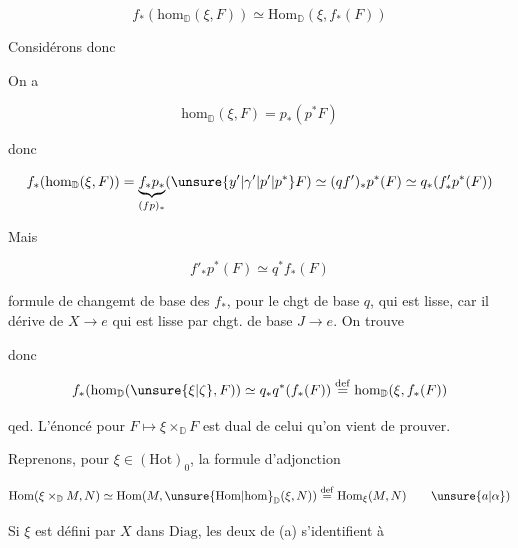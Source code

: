 \[f_*(\mathrm{hom}_{\mathbb D}(\xi,F))\simeq \mathrm{Hom}_{\mathbb D}(\xi,f_*(F))\]

Considérons donc


On a

\[\mathrm{hom}_{\mathbb D}(\xi,F)=p_*(p^*F)\]

donc

\[f_*(\mathrm{hom}_{\mathbb D}(\xi,F))=\underbrace{f_*p_*}_{(fp)_*}(\unsure{y'|\gamma'|p'|p^*}F)\simeq(qf')_*p^*(F)\simeq q_*(f'_*p^*(F))\]

Mais

\[f'_*p^*(F)\simeq q^*f_*(F)\]

formule de changemt de base des $f_*$, pour le chgt de base $q$, qui est lisse, car il dérive de $X\longrightarrow e$ qui est lisse par chgt. de base $J\longrightarrow e$. On trouve


donc

\[f_*(\mathrm{hom}_{\mathbb D}(\unsure{\xi|\zeta},F))\simeq q_*q^*(f_*(F))\overset{\mathrm{def}}{=}\mathrm{hom}_{\mathbb D}(\xi,f_*(F))\]

qed. L'énoncé pour $F\mapsto\xi\times_{\mathbb D}F$ est dual de celui qu'on vient de prouver.

Reprenons, pour $\xi\in(\mathrm{Hot})_0$, la formule d'adjonction

\[\mathrm{Hom}(\xi\times_{\mathbb D}M,N)\simeq\mathrm{Hom}(M,\unsure{\mathrm{Hom}|\mathrm{hom}}_{\mathbb D}(\xi,N))\overset{\mathrm{def}}{=}\mathrm{Hom}_{\xi}(M,N)\tag*{\(\unsure{a|\alpha})\)}\]


Si $\xi$ est défini par $X$ dans $\mathrm{Diag}$, les deux  de (a) s'identifient à

